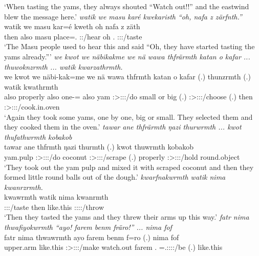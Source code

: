\begin{exe}
	\trans `When tasting the yams, they always shouted ``Watch out!!'' and the eastwind blew the message here.'
	\emph{watik we masu karé kwekaristh ``oh, nafa z zärfnth.''}\\
	\gll watik we masu kar=é kweth oh nafa z zäth\\ 
	then also masu place=\Erg.{\Nsg} \Stpl:\Sbj:\Iter/hear oh \Tnsg.{\Erg} {\Iam} \Stpl:\Sbj:\Rpst:\Pfv/taste\\
	\trans `The Masu people used to hear this and said ``Oh, they have started tasting the yams already.'''
	\emph{we kwot we näbikakme we nä wawa thfrärmth katan o kafar ... thuwoknzrmth ... watik kwarzathrmth.}\\
	\gll we kwot we näbi-kak=me we nä wawa thfrmth katan o kafar (.) thunzrmth (.) watik kwathrmth\\ 
	also properly also one-\Distr={\Ins} also {\Indf} yam \Stpl:\Sbj>\Stpl:\Obj:\Pst:\Dur/do small or big (.) \Stpl:\Sbj>\Stpl:\Obj:\Pst:\Dur/choose (.) then \Stpl:\Sbj>\Stpl:\Obj:\Pst:\Dur/cook.in.oven\\
	\trans `Again they took some yams, one by one, big or small. They selected them and they cooked them in the oven.'
	\emph{tawar ane thfrärmth ŋazi thurwrmth ... kwot thufathwrmth kobakob}\\
	\gll tawar ane thfrmth ŋazi thurmth (.) kwot thuwrmth kobakob\\ 
	yam.pulp {\Dem} \Stpl:\Sbj>\Stpl:\Obj:\Pst:\Dur/do coconut \Stpl:\Sbj>\Stpl:\Obj:\Pst:\Dur/scrape (.) properly \Stpl:\Sbj>\Stpl:\Obj:\Pst:\Dur/hold round.object\\
	\trans `They took out the yam pulp and mixed it with scraped coconut and then they formed little round balls out of the dough.'
	\emph{kwarfnakwrmth watik nima kwanrzrmth.}\\
	\gll kwawrmth watik nima kwanrmth\\ 
	\Sg:\Sbj:\Pst:\Dur/taste then like.this \Sg:\Sbj:\Pst:\Dur:\Venit/throw\\
	\trans `Then they tasted the yams and they threw their arms up this way.'
	\emph{fatr nima thwafiyokwrmth ``ayo! farem benm fräro!'' ... nima fof}\\
	\gll fatr nima thwawrmth ayo farem benm f=ro (.) nima fof\\ 
	upper.arm like.this \Stpl:\Sbj>\Stpl:\Obj:\Pst:\Dur/make watch.out farem \Snsg.{\Dat} \Dist=\Tsg.\F:\Sbj:\Nonpast:\Ipfv:\Andat/be (.) like.this {\Emph}\\

\end{exe}
